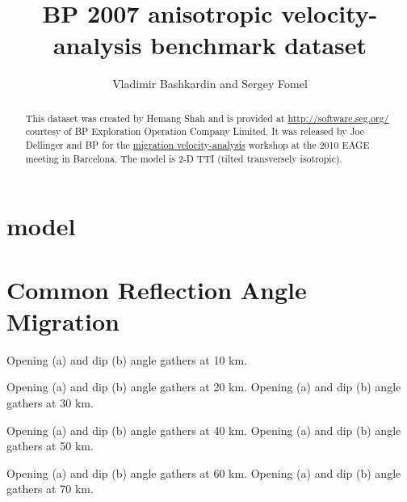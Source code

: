 \author{Vladimir Bashkardin and Sergey Fomel}
\title{BP 2007 anisotropic velocity-analysis benchmark dataset}

\maketitle

\begin{abstract}
  This dataset was created by Hemang Shah and is provided at
  \url{http://software.seg.org/} courtesy of BP Exploration Operation
  Company Limited. It was released by Joe Dellinger and BP for the
  \href{http://www.eage.org/events/index.php?evp=2973&ActiveMenu=17&Opendivs=s3,s16,s17}{migration
    velocity-analysis} workshop at the 2010 EAGE meeting in
  Barcelona. The model is 2-D TTI (tilted transversely isotropic).
\end{abstract}

\section{model}

 \clearpage
{} \clearpage
{} \clearpage
{} \clearpage
{} \clearpage
{} \clearpage

 \clearpage
{} \clearpage

\section{Common Reflection Angle Migration}

{Opening (a) and dip (b) angle gathers at 10 km.} \clearpage

{Opening (a) and dip (b) angle gathers at 20 km.}
{Opening (a) and dip (b) angle gathers at 30 km.} \clearpage

{Opening (a) and dip (b) angle gathers at 40 km.}
{Opening (a) and dip (b) angle gathers at 50 km.} \clearpage

{Opening (a) and dip (b) angle gathers at 60 km.}
{Opening (a) and dip (b) angle gathers at 70 km.} \clearpage
